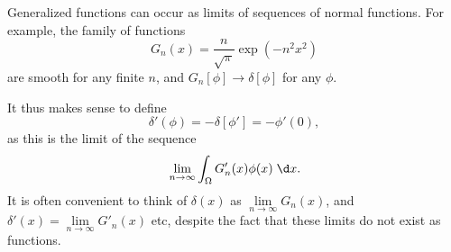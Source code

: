 \documentclass[a4paper]{article}
\begin{document}
Generalized functions can occur as limits of sequences of normal functions. For example, the family of functions
\[
  G_n(x) = \frac{n}{\sqrt{\pi}} \exp(-n^2 x^2)
\]
are smooth for any finite $n$, and $G_n[\phi] \to \delta[\phi]$ for any $\phi$.
\begin{center}
\end{center}
It thus makes sense to define
\[
  \delta'(\phi) = -\delta[\phi'] = -\phi'(0),
\]
as this is the limit of the sequence
\[
  \lim_{n \to \infty}\int_\Omega G'_n(x) \phi(x)\;\d x.
\]
It is often convenient to think of $\delta(x)$ as $\lim\limits_{n \to \infty} G_n(x)$, and $\delta'(x) = \lim\limits_{n \to \infty} G'_n(x)$ etc, despite the fact that these limits do not exist as functions.
\end{document}
